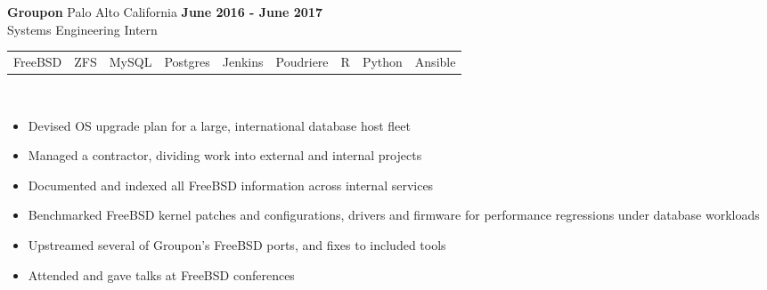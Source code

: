 \documentclass[resmargin,line,12pt]{res}
\begin{document}
{\begin{resume}
{\bf Groupon} Palo Alto California \hfill {\bf June 2016 - June 2017} \
\\
{Systems Engineering Intern}
\\
\begin{tabular}{l l l l l l l l l}
  FreeBSD & ZFS & MySQL & Postgres & Jenkins & Poudriere & R & Python & Ansible
\end{tabular}
\\
\vspace{-.10in}
\begin{itemize}
  \item Devised OS upgrade plan for a large, international database host fleet
  \item Managed a contractor, dividing work into external and internal projects
  \item Documented and indexed all FreeBSD information across internal services
  \item Benchmarked FreeBSD kernel patches and configurations, drivers and firmware for performance regressions under database workloads
  \item Upstreamed several of Groupon's FreeBSD ports, and fixes to included tools
  \item Attended and gave talks at FreeBSD conferences
\end{itemize}
\vspace{-.10in}



\end{resume}}
\end{document}
